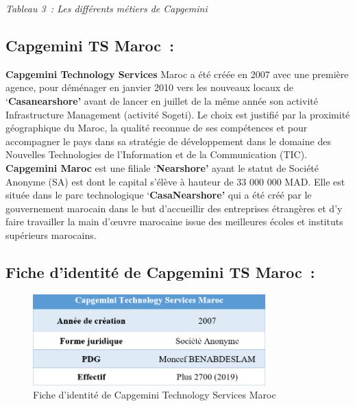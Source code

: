 \documentclass[12pt,a4paper,twoside,openright]{report}
\begin{document}
\begin{center}
\textit{Tableau 3~: Les différents métiers de Capgemini}
\end{center}

\hypertarget{capgemini-ts-maroc}{%
\subsection{Capgemini TS Maroc~:}\label{capgemini-ts-maroc}}

\textbf{Capgemini Technology Services} Maroc a été créée en 2007 avec
une première agence, pour déménager en janvier 2010 vers les nouveaux
locaux de `\textbf{Casanearshore'} avant de lancer en juillet de la même
année son activité Infrastructure Management (activité Sogeti). Le choix
est justifié par la proximité géographique du Maroc, la qualité reconnue
de ses compétences et pour accompagner le pays dans sa stratégie de
développement dans le domaine des Nouvelles Technologies de
l'Information et de la Communication (TIC). \textbf{Capgemini Maroc} est
une filiale `\textbf{Nearshore'} ayant le statut de Société Anonyme (SA)
est dont le capital s'élève à hauteur de 33 000 000 MAD. Elle est située
dans le parc technologique `\textbf{CasaNearshore'} qui a été créé par
le gouvernement marocain dans le but d'accueillir des entreprises
étrangères et d'y faire travailler la main d'œuvre marocaine issue des
meilleures écoles et instituts supérieurs marocains.

\hypertarget{fiche-didentituxe9-de-capgemini-ts-maroc}{%
\subsection{Fiche d'identité de Capgemini TS
Maroc~:}\label{fiche-didentituxe9-de-capgemini-ts-maroc}}

\begin{figure}[htbp]
    \centering
    \includegraphics[width=0.8\textwidth]{latex_media/media/image4.png}
    \caption{Fiche d'identité de Capgemini Technology Services Maroc}
    \label{fig:fiche-capgemini-ts}
\end{figure}
\end{document}
